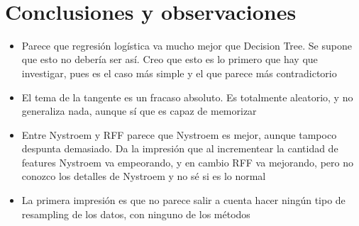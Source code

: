 \documentclass[11pt]{article}
\providecommand{\tightlist}{%
      \setlength{\itemsep}{0pt}\setlength{\parskip}{0pt}}
\begin{document}
    \begin{center}
    \end{center}
    { \hspace*{\fill} \\}
    
    \section{Conclusiones y
observaciones}\label{conclusiones-y-observaciones}

    \begin{itemize}
\tightlist
\item
  Parece que regresión logística va mucho mejor que Decision Tree. Se
  supone que esto no debería ser así. Creo que esto es lo primero que
  hay que investigar, pues es el caso más simple y el que parece más
  contradictorio
\item
  El tema de la tangente es un fracaso absoluto. Es totalmente
  aleatorio, y no generaliza nada, aunque sí que es capaz de memorizar
\item
  Entre Nystroem y RFF parece que Nystroem es mejor, aunque tampoco
  despunta demasiado. Da la impresión que al incrementear la cantidad de
  features Nystroem va empeorando, y en cambio RFF va mejorando, pero no
  conozco los detalles de Nystroem y no sé si es lo normal
\item
  La primera impresión es que no parece salir a cuenta hacer ningún tipo
  de resampling de los datos, con ninguno de los métodos
\end{itemize}


    
    
    
    
\end{document}
